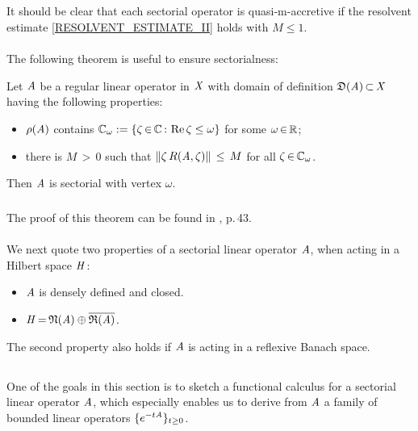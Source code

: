\documentclass[11pt,twoside]{article}
\begin{document}
\subparagraph{}
It should be clear that each sectorial operator is quasi-m-accretive
if the resolvent estimate \eqref{RESOLVENT_ESTIMATE_II} holds with $M \leq 1$.

\paragraph{} %
The following theorem is useful to ensure sectorialness:

\begin{theorem}\label{CRITERION_FOR_SECTORIALNESS}
Let $\mathit{A}$ be a regular linear operator in $\mathit{X}$ with domain of definition
$\mathfrak{D}(\mathit{A}) {\,\subset\,} \mathit{X}$ having the following properties:

\begin{itemize}[leftmargin=9mm]
\item[(a)]
$\rho(\mathit{A})$ contains
${\mathbb{C}}_{\omega} := \{\zeta {\,\in\,} {\mathbb{C}} {\,:\,} \operatorname{Re} \zeta \leq \omega\}$
for some $\omega {\,\in\,} {\mathbb{R}}$;

\item[(b)]
there is $M {\,>\,} 0$ such that
$\left\lVert \zeta \, R(\mathit{A},\zeta) \right\rVert \, \leq \, M$ for all $\zeta {\,\in\,} {\mathbb{C}}_{\omega}$.
\end{itemize}
Then $\mathit{A}$ is sectorial with vertex $\omega$.
\end{theorem}

\subparagraph{} %
The proof of this theorem can be found in \cite{Lu}, p.\,43.

\paragraph{} %
We next quote two properties of a sectorial linear operator $\mathit{A}$,
when acting in a Hilbert space $\mathit{H}$:

\begin{itemize}[leftmargin=7mm,itemsep=3pt]
\item[1.]
$\mathit{A}$ is densely defined and closed.
\item[2.]
$\mathit{H} {\,=\,} \mathfrak{N}(\mathit{A}) \oplus \overline{\mathfrak{R}(\mathit{A})}$.
\end{itemize}

The second property also holds
if $\mathit{A}$ is acting in a reflexive Banach space.

\subsection{} %
One of the goals in this section is
to sketch a functional calculus for a sectorial linear operator $\mathit{A}$,
which especially enables us to derive from $\mathit{A}$
a family of bounded linear operators $\{e^{-t \mathit{A}}\}_{t \geq 0}$.
\end{document}

